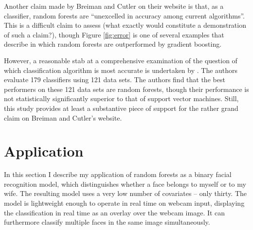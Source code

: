 \documentclass[10pt,a4paper]{article}
\begin{document}
Another claim made by Breiman and Cutler on their website is that, as a classifier, random forests are ``unexcelled in accuracy among current algorithms''. This is a difficult claim to assess (what exactly would constitute a demonstration of such a claim?), though Figure \ref{fig:error} is one of several examples that \citet{Hastie2009} describe in which random forests are outperformed by gradient boosting.

However, a reasonable stab at a comprehensive examination of the question of which classification algorithm is most accurate is undertaken by \citet{Fernandez-Delgado2014}. The authors evaluate 179 classifiers using 121 data sets. The authors find that the best performers on these 121 data sets are random forests, though their performance is not statistically significantly superior to that of support vector machines. Still, this study provides at least a substantive piece of support for the rather grand claim on Breiman and Cutler's website.

\section{Application}\label{application}

In this section I describe my application of random forests as a binary facial recognition model, which distinguishes whether a face belongs to myself or to my wife. The resulting model uses a very low number of covariates -- only thirty. The model is lightweight enough to operate in real time on webcam input, displaying the classification in real time as an overlay over the webcam image. It can furthermore classify multiple faces in the same image simultaneously.
\end{document}

